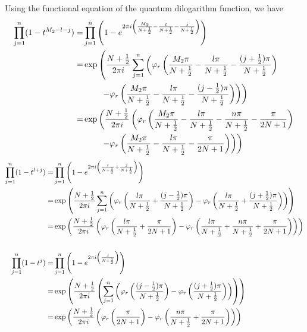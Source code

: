\documentclass[10pt,a4paper]{article}
\newcommand{\lt}{\left}
\newcommand{\rt}{\right}
\begin{document}
Using the functional equation of the quantum dilogarithm function, we have
\begin{align}
 \prod_{j=1}^{n} (1-t^{M_2-l-j}) 
=&\prod_{j=1}^n \lt(1 - e^{2\pi i \lt(\frac{M_2}{N+\frac{1}{2}} - \frac{l}{N+\frac{1}{2}} - \frac{j}{N+\frac{1}{2}}\rt)}\rt)\notag \\
=&\exp\lt(\frac{N+\frac{1}{2}}{2\pi i} \sum_{j=1}^n \lt( \varphi_r \lt(\frac{M_2 \pi }{N+\frac{1}{2}} - \frac{l\pi}{N+\frac{1}{2}} - \frac{(j+\frac{1}{2})\pi}{N+\frac{1}{2}}\rt) \rt. \rt.\notag\\
&\lt. \lt.\qquad - \varphi_r\lt( \frac{M_2\pi}{N+\frac{1}{2}} - \frac{l\pi}{N+\frac{1}{2}} - \frac{(j-\frac{1}{2})\pi}{N+\frac{1}{2}}\rt)  \rt) \rt) \notag\\
=& \exp \lt(\frac{N+\frac{1}{2}}{2\pi i} \lt(\varphi_r \lt( \frac{M_2\pi}{N+\frac{1}{2}} - \frac{l\pi}{N+\frac{1}{2}} - \frac{n\pi}{N+\frac{1}{2}} - \frac{\pi}{2N+1}\rt) \rt.\rt.\notag\\
&\lt.  \lt.\qquad - \varphi_r\lt(\frac{M_2\pi}{N+\frac{1}{2}} - \frac{l\pi}{N+\frac{1}{2}} - \frac{\pi}{2N+1}\rt)  \rt)  \rt)\label{t6}
\end{align}
\begin{align}
 \prod_{j=1}^{n} (1-t^{l+j})
=&\prod_{j=1}^n \lt(1 - e^{2\pi i \lt(\frac{l}{N+\frac{1}{2}} + \frac{j}{N+\frac{1}{2}}\rt)}\rt)\notag \\
=&\exp\lt(\frac{N+\frac{1}{2}}{2\pi i} \sum_{j=1}^n \lt( \varphi_r \lt(\frac{l\pi}{N+\frac{1}{2}} + \frac{(j-\frac{1}{2})\pi}{N+\frac{1}{2}}\rt)  - \varphi_r\lt( \frac{l\pi}{N+\frac{1}{2}} + \frac{(j+\frac{1}{2})\pi}{N+\frac{1}{2}}\rt)  \rt) \rt)\notag \\
=&\exp\lt(\frac{N+\frac{1}{2}}{2\pi i} \lt( \varphi_r \lt(\frac{l\pi}{N+\frac{1}{2}} + \frac{\pi}{2N+1}\rt)  - \varphi_r\lt( \frac{l\pi}{N+\frac{1}{2}} + \frac{n\pi}{N+\frac{1}{2}}+\frac{\pi}{2N+1}\rt)  \rt) \rt)\label{t7}
\\ \notag\\
 \prod_{j=1}^{n} (1-t^{j})
=&\prod_{j=1}^n \lt(1 - e^{2\pi i \lt(\frac{j}{N+\frac{1}{2}}\rt)}\rt) \notag\\
=&\exp\lt(\frac{N+\frac{1}{2}}{2\pi i} \lt(\sum_{j=1}^n \lt( \varphi_r \lt( \frac{(j-\frac{1}{2})\pi}{N+\frac{1}{2}}\rt)  - \varphi_r\lt( \frac{(j+\frac{1}{2})\pi}{N+\frac{1}{2}}\rt)  \rt) \rt)\rt)\notag \\
=&\exp\lt(\frac{N+\frac{1}{2}}{2\pi i} \lt( \varphi_r \lt(  \frac{\pi}{2N+1}\rt)  - \varphi_r\lt( \frac{n\pi}{N+\frac{1}{2}} + \frac{\pi}{2N+1}\rt)   \rt) \rt) \label{t8}
 \end{align}
 
\end{document}
